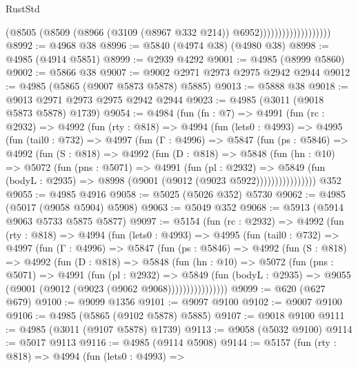 \begin{lexlean}{RustStd}
\begin{coremodule}
                                    (@8505
                                      (@8509
                                        (@8966 (@3109 (@8967 @332 @214)) @6952)))))))))))))))))))
@8992 := @4968 @38
@8996 := @5840 (@4974 @38) (@4980 @38)
@8998 := @4985 (@4914 @5851)
@8999 := @2939 @4292
@9001 := @4985 (@8999 @5860)
@9002 := @5866 @38
@9007 := @9002 @2971 @2973 @2975 @2942 @2944
@9012 := @4985 (@5865 (@9007 @5873 @5878) @5885)
@9013 := @5888 @38
@9018 := @9013 @2971 @2973 @2975 @2942 @2944
@9023 := @4985 (@3011 (@9018 @5873 @5878) @1739)
@9054 := @4984
    (fun (fn : @7) =>
    @4991
      (fun (rc : @2932) =>
      @4992
        (fun (rty : @818) =>
        @4994
          (fun (lets0 : @4993) =>
          @4995
            (fun (tail0 : @732) =>
            @4997
              (fun (Γ : @4996) =>
              @5847
                (fun (ps : @5846) =>
                @4992
                  (fun (S : @818) =>
                  @4992
                    (fun (D : @818) =>
                    @5848
                      (fun (hn : @10) =>
                      @5072
                        (fun (pns : @5071) =>
                        @4991
                          (fun (pl : @2932) =>
                          @5849
                            (fun (bodyL : @2935) => @8998 (@9001 (@9012 (@9023 @5922))))))))))))))))
    @352
@9055 := @4985 @4916
@9058 := @5025 (@5026 @352) @5730
@9062 := @4985 (@5017 (@9058 @5904) @5908)
@9063 := @5049 @352
@9068 := @5913 (@5914 @9063 @5733 @5875 @5877)
@9097 := @5154
    (fun (rc : @2932) =>
    @4992
      (fun (rty : @818) =>
      @4994
        (fun (lets0 : @4993) =>
        @4995
          (fun (tail0 : @732) =>
          @4997
            (fun (Γ : @4996) =>
            @5847
              (fun (ps : @5846) =>
              @4992
                (fun (S : @818) =>
                @4992
                  (fun (D : @818) =>
                  @5848
                    (fun (hn : @10) =>
                    @5072
                      (fun (pns : @5071) =>
                      @4991
                        (fun (pl : @2932) =>
                        @5849
                          (fun (bodyL : @2935) =>
                          @9055 (@9001 (@9012 (@9023 (@9062 @9068))))))))))))))))
@9099 := @620 (@627 @679)
@9100 := @9099 @1356
@9101 := @9097 @9100
@9102 := @9007 @9100
@9106 := @4985 (@5865 (@9102 @5878) @5885)
@9107 := @9018 @9100
@9111 := @4985 (@3011 (@9107 @5878) @1739)
@9113 := @9058 (@5032 @9100)
@9114 := @5017 @9113
@9116 := @4985 (@9114 @5908)
@9144 := @5157
    (fun (rty : @818) =>
    @4994
      (fun (lets0 : @4993) =>

\end{coremodule}
\end{lexlean}
